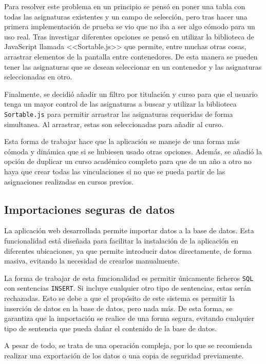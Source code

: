 Para resolver este problema en un principio se pensó en poner una tabla con todas las asignaturas existentes y un campo de selección, pero tras hacer una primera implementación de prueba se vio que no iba a ser algo cómodo para un uso real.
Tras investigar diferentes opciones se pensó en utilizar la biblioteca de JavaScript llamada <<Sortable.js>> que permite, entre muchas otras cosas, arrastrar elementos de la pantalla entre contenedores.
De esta manera se pueden tener las asignaturas que se desean seleccionar en un contenedor y las asignaturas seleccionadas en otro.

Finalmente, se decidió añadir un filtro por titulación y curso para que el usuario tenga un mayor control de las asignaturas a buscar y utilizar la biblioteca \texttt{Sortable.js} para permitir arrastrar las asignaturas requeridas de forma simultanea.
Al arrastrar, estas son seleccionadas para añadir al curso.

Esta forma de trabajar hace que la aplicación se maneje de una forma más cómoda y dinámica que si se hubiesen usado otras opciones.
Además, se añadió la opción de duplicar un curso académico completo para que de un año a otro no haya que crear todas las vinculaciones si no que se pueda partir de las asignaciones realizadas en cursos previos.

\subsection{Importaciones seguras de datos}
La aplicación web desarrollada permite importar datos a la base de datos.
Esta funcionalidad está diseñada para facilitar la instalación de la aplicación en diferentes ubicaciones, ya que permite introducir datos directamente, de forma masiva, evitando la necesidad de crearlos manualmente.

La forma de trabajar de esta funcionalidad es permitir únicamente ficheros \texttt{SQL} con sentencias \texttt{INSERT}. 
Si incluye cualquier otro tipo de sentencias, estas serán rechazadas.
Esto se debe a que el propósito de este sistema es permitir la inserción de datos en la base de datos, pero nada más.
De esta forma, se garantiza que la importación se realice de una forma segura, evitando cualquier tipo de sentencia que pueda dañar el contenido de la base de datos.

A pesar de todo, se trata de una operación compleja, por lo que se recomienda realizar una exportación de los datos o una copia de seguridad previamente.

